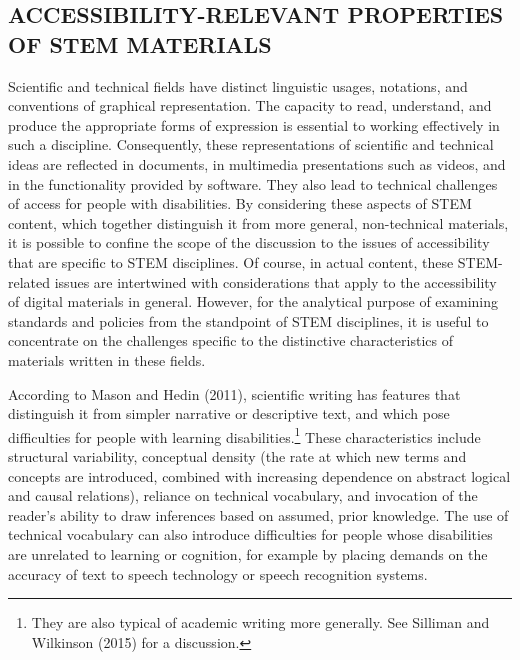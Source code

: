 \documentclass{sig-alternate} %
\begin{document}
\begin{large}
\section*{ACCESSIBILITY-RELEVANT PROPERTIES OF STEM MATERIALS}

Scientific and technical fields have distinct linguistic usages, notations, and conventions of graphical representation. The capacity to read, understand, and produce the appropriate forms of expression is essential to working effectively in such a discipline. Consequently, these representations of scientific and technical ideas are reflected in documents, in multimedia presentations such as videos, and in the functionality provided by software. They also lead to technical challenges of access for people with disabilities. By considering these aspects of STEM content, which together distinguish it from more general, non-technical materials, it is possible to confine the scope of the discussion to the issues of accessibility that are specific to STEM disciplines. Of course, in actual content, these STEM-related issues are intertwined with considerations that apply to the accessibility of digital materials in general. However, for the analytical purpose of examining standards and policies from the standpoint of STEM disciplines, it is useful to concentrate on the challenges specific to the distinctive characteristics of materials written in these fields.

According to Mason and Hedin (2011), scientific writing has features that distinguish it from simpler narrative or descriptive text, and which pose difficulties for people with learning disabilities.\footnote{They are also typical of academic writing more generally. See Silliman and Wilkinson (2015) for a discussion.} These characteristics include structural variability, conceptual density (the rate at which new terms and concepts are introduced, combined with increasing dependence on abstract logical and causal relations), reliance on technical vocabulary, and invocation of the reader’s ability to draw inferences based on assumed, prior knowledge. The use of technical vocabulary can also introduce difficulties for people whose disabilities are unrelated to learning or cognition, for example by placing demands on the accuracy of text to speech technology or speech recognition systems.


\end{large}
\end{document}
